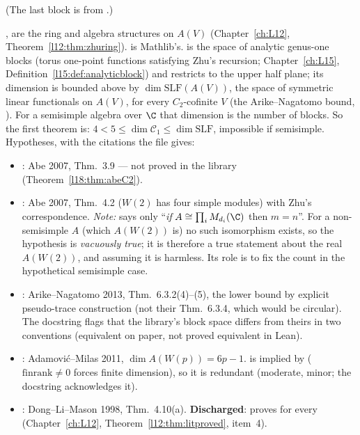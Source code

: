 \noindent (The last block is from .)
\begin{dictionary}
,  are the ring and algebra structures on $A(V)$ (Chapter~\ref{ch:L12},
Theorem~\ref{l12:thm:zhuring}).  is Mathlib's.  is the space of
analytic genus-one blocks (torus one-point functions satisfying Zhu's recursion; Chapter~\ref{ch:L15},
Definition~\ref{l15:def:analyticblock}) and  restricts to the upper half plane; its dimension
is bounded above by $\dim\mathrm{SLF}(A(V))$, the space of symmetric linear functionals on $A(V)$, for every
$C_2$-cofinite $V$ (the Arike--Nagatomo bound, ). For a semisimple algebra
over $\C$ that dimension is the number of blocks. So the first theorem is: $4<5\le\dim\mathcal C_1\le\dim\mathrm{SLF}$,
impossible if semisimple. Hypotheses, with the citations the file gives:
\begin{itemize}
\item {}: Abe 2007, Thm.~3.9 --- not proved in the library (Theorem~\ref{l18:thm:abeC2}).
\item {}: Abe 2007, Thm.~4.2 ($W(2)$ has four simple modules) with Zhu's correspondence.
  \emph{Note:}  says only ``\emph{if} $A\cong\prod_iM_{d_i}(\C)$ then $m=n$''. For a
  non-semisimple $A$ (which $A(W(2))$ is) no such isomorphism exists, so the hypothesis is \emph{vacuously true};
  it is therefore a true statement about the real $A(W(2))$, and assuming it is harmless. Its role is to fix the
  count in the hypothetical semisimple case.
\item {}: Arike--Nagatomo 2013, Thm.~6.3.2(4)--(5), the lower bound by explicit pseudo-trace
  construction (not their Thm.~6.3.4, which would be circular). The docstring flags that the library's block space
  differs from theirs in two conventions (equivalent on paper, not proved equivalent in Lean).
\item {}: Adamovi\'c--Milas 2011, $\dim A(W(p))=6p-1$.  is implied by 
  ($\mathrm{finrank}\ne0$ forces finite dimension), so it is redundant (moderate, minor; the docstring acknowledges it).
\item {}: Dong--Li--Mason 1998, Thm.~4.10(a). \textbf{Discharged}:  proves
   for every  (Chapter~\ref{ch:L12}, Theorem~\ref{l12:thm:litproved}, item~4).
\end{itemize}
\end{dictionary}
